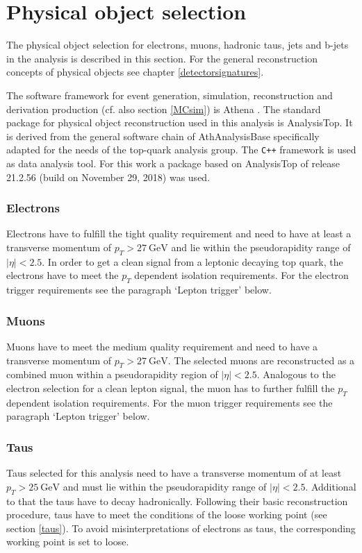 \section{Physical object selection}\label{physObj}
The physical object selection for electrons, muons, hadronic taus, jets and b-jets in the analysis is described in this section. For the general reconstruction concepts of physical objects see chapter \ref{detectorsignatures}.\par
The {\ATLAS} software framework for event generation, simulation, reconstruction and derivation production (cf. also section \ref{MCsim}) is Athena \cite{Athena}. %
The standard package for physical object reconstruction used in this analysis is AnalysisTop. It is derived from the general software chain of AthAnalysisBase specifically adapted for the needs of the top-quark analysis group. The \texttt{C++} framework {\ROOT} is used as data analysis tool. For this work a package based on AnalysisTop of release 21.2.56 (build on November 29, 2018) was used.\par
\subsubsection*{Electrons}
Electrons have to fulfill the tight quality requirement and need to have at least a transverse momentum of $p_T>\SI{27}{\giga\electronvolt}$ and lie within the pseudorapidity range of $|\eta|<2.5$. In order to get a clean signal from a leptonic decaying top quark, the electrons have to meet the $p_T$ dependent isolation requirements. For the electron trigger requirements see the paragraph `Lepton trigger' below.
\subsubsection*{Muons}
Muons have to meet the medium quality requirement and need to have a transverse momentum of $p_T>\SI{27}{\giga\electronvolt}$. The selected muons are reconstructed as a combined muon within a pseudorapidity region of $|\eta|<2.5$. Analogous to the electron selection for a clean lepton signal, the muon has to further fulfill the $p_T$ dependent isolation requirements. For the muon trigger requirements see the paragraph `Lepton trigger' below. 
\subsubsection*{Taus}
Taus selected for this analysis need to have a transverse momentum of at least $p_T>\SI{25}{\giga\electronvolt}$ and must lie within the pseudorapidity range of $|\eta|<2.5$. Additional to that the taus have to decay hadronically. Following their basic reconstruction procedure, taus have to meet the conditions of the loose working point (see section \ref{taus}). To avoid misinterpretations of electrons as taus, the corresponding working point is set to loose.
